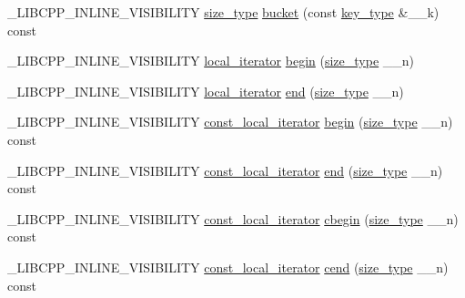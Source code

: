 \begin{DoxyCompactItemize}
\item 
\+\_\+\+L\+I\+B\+C\+P\+P\+\_\+\+I\+N\+L\+I\+N\+E\+\_\+\+V\+I\+S\+I\+B\+I\+L\+I\+T\+Y \hyperlink{classunordered__multimap_a977c4093df6d4d0302f280de19af4b58}{size\+\_\+type} \hyperlink{classunordered__multimap_af0a37a1ef16ed0295c3c88e3db6a3f82}{bucket} (const \hyperlink{classunordered__multimap_a2902747087a03531493d30e9840f67d9}{key\+\_\+type} \&\+\_\+\+\_\+k) const 
\item 
\+\_\+\+L\+I\+B\+C\+P\+P\+\_\+\+I\+N\+L\+I\+N\+E\+\_\+\+V\+I\+S\+I\+B\+I\+L\+I\+T\+Y \hyperlink{classunordered__multimap_a672fd63d94f807d130e2026d2863d40c}{local\+\_\+iterator} \hyperlink{classunordered__multimap_adcf1c56592b5024badda959710468e58}{begin} (\hyperlink{classunordered__multimap_a977c4093df6d4d0302f280de19af4b58}{size\+\_\+type} \+\_\+\+\_\+n)
\item 
\+\_\+\+L\+I\+B\+C\+P\+P\+\_\+\+I\+N\+L\+I\+N\+E\+\_\+\+V\+I\+S\+I\+B\+I\+L\+I\+T\+Y \hyperlink{classunordered__multimap_a672fd63d94f807d130e2026d2863d40c}{local\+\_\+iterator} \hyperlink{classunordered__multimap_a6bd63b6d5f0158c7dc9c3becc642a0fc}{end} (\hyperlink{classunordered__multimap_a977c4093df6d4d0302f280de19af4b58}{size\+\_\+type} \+\_\+\+\_\+n)
\item 
\+\_\+\+L\+I\+B\+C\+P\+P\+\_\+\+I\+N\+L\+I\+N\+E\+\_\+\+V\+I\+S\+I\+B\+I\+L\+I\+T\+Y \hyperlink{classunordered__multimap_a4813834c894681f449b5afe718336482}{const\+\_\+local\+\_\+iterator} \hyperlink{classunordered__multimap_aeb2b39ffb1de46c6dffd2c525943906d}{begin} (\hyperlink{classunordered__multimap_a977c4093df6d4d0302f280de19af4b58}{size\+\_\+type} \+\_\+\+\_\+n) const 
\item 
\+\_\+\+L\+I\+B\+C\+P\+P\+\_\+\+I\+N\+L\+I\+N\+E\+\_\+\+V\+I\+S\+I\+B\+I\+L\+I\+T\+Y \hyperlink{classunordered__multimap_a4813834c894681f449b5afe718336482}{const\+\_\+local\+\_\+iterator} \hyperlink{classunordered__multimap_ad920c688a25fbb926b170b14a25f6790}{end} (\hyperlink{classunordered__multimap_a977c4093df6d4d0302f280de19af4b58}{size\+\_\+type} \+\_\+\+\_\+n) const 
\item 
\+\_\+\+L\+I\+B\+C\+P\+P\+\_\+\+I\+N\+L\+I\+N\+E\+\_\+\+V\+I\+S\+I\+B\+I\+L\+I\+T\+Y \hyperlink{classunordered__multimap_a4813834c894681f449b5afe718336482}{const\+\_\+local\+\_\+iterator} \hyperlink{classunordered__multimap_a392690c861a688c143c2ff1fce54a524}{cbegin} (\hyperlink{classunordered__multimap_a977c4093df6d4d0302f280de19af4b58}{size\+\_\+type} \+\_\+\+\_\+n) const 
\item 
\+\_\+\+L\+I\+B\+C\+P\+P\+\_\+\+I\+N\+L\+I\+N\+E\+\_\+\+V\+I\+S\+I\+B\+I\+L\+I\+T\+Y \hyperlink{classunordered__multimap_a4813834c894681f449b5afe718336482}{const\+\_\+local\+\_\+iterator} \hyperlink{classunordered__multimap_a1a330d88f72a77d5343b4ba7ee35246f}{cend} (\hyperlink{classunordered__multimap_a977c4093df6d4d0302f280de19af4b58}{size\+\_\+type} \+\_\+\+\_\+n) const 

\end{DoxyCompactItemize}
